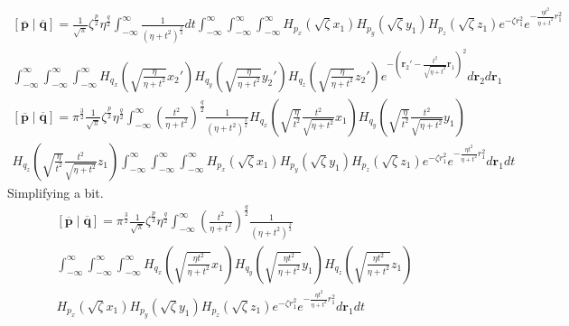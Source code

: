 \begin{multline}
  \left[\overline{\mathbf{p}}\middle|\overline{\mathbf{q}}\right] = \frac{1}{\sqrt{\pi}} \zeta^{\frac{p}{2}} \eta^{\frac{q}{2}} \int_{-\infty}^\infty \frac{1}{\left(\eta + t^2\right)^{\frac{3}{2}}} dt \int_{-\infty}^\infty \int_{-\infty}^\infty \int_{-\infty}^\infty H_{p_x}\left(\sqrt{\zeta} x_1\right) H_{p_y}\left(\sqrt{\zeta} y_1\right) H_{p_z}\left(\sqrt{\zeta} z_1\right) e^{-\zeta r_1^2}e^{-\frac{\eta t^2}{\eta + t^2}r_1^2} \\
  \int_{-\infty}^\infty \int_{-\infty}^\infty \int_{-\infty}^\infty H_{q_x}\left(\sqrt{\frac{\eta}{\eta + t^2}}x_2'\right)H_{q_y}\left(\sqrt{\frac{\eta}{\eta + t^2}}y_2'\right)H_{q_z}\left(\sqrt{\frac{\eta}{\eta + t^2}}z_2'\right) e^{-\left(\mathbf{r}_2' - \frac{t^2}{\sqrt{\eta + t^2}}\mathbf{r}_1\right)^2} d\mathbf{r}_2 d\mathbf{r}_1
\end{multline}
\begin{multline}
  \left[\overline{\mathbf{p}}\middle|\overline{\mathbf{q}}\right] = \pi^{\frac{3}{2}} \frac{1}{\sqrt{\pi}} \zeta^{\frac{p}{2}} \eta^{\frac{q}{2}} \int_{-\infty}^\infty \left(\frac{t^2}{\eta + t^2}\right)^{\frac{q}{2}} \frac{1}{\left(\eta + t^2\right)^{\frac{3}{2}}} H_{q_x}\left(\sqrt{\frac{\eta}{t^2}}\frac{t^2}{\sqrt{\eta + t^2}} x_1\right) H_{q_y}\left(\sqrt{\frac{\eta}{t^2}}\frac{t^2}{\sqrt{\eta + t^2}} y_1\right)\\
  H_{q_z}\left(\sqrt{\frac{\eta}{t^2}}\frac{t^2}{\sqrt{\eta + t^2}} z_1\right)\int_{-\infty}^\infty \int_{-\infty}^\infty \int_{-\infty}^\infty H_{p_x}\left(\sqrt{\zeta} x_1\right) H_{p_y}\left(\sqrt{\zeta} y_1\right) H_{p_z}\left(\sqrt{\zeta} z_1\right) e^{-\zeta r_1^2}e^{-\frac{\eta t^2}{\eta + t^2}r_1^2} d\mathbf{r}_1 dt  
\end{multline}
Simplifying a bit.
\begin{multline}
  \left[\overline{\mathbf{p}}\middle|\overline{\mathbf{q}}\right] = \pi^{\frac{3}{2}} \frac{1}{\sqrt{\pi}} \zeta^{\frac{p}{2}} \eta^{\frac{q}{2}} \int_{-\infty}^\infty \left(\frac{t^2}{\eta + t^2}\right)^{\frac{q}{2}}\frac{1}{\left(\eta + t^2\right)^{\frac{3}{2}}}\\
  \int_{-\infty}^\infty \int_{-\infty}^\infty \int_{-\infty}^\infty H_{q_x}\left(\sqrt{\frac{\eta t^2}{\eta + t^2}}x_1\right)H_{q_y}\left(\sqrt{\frac{\eta t^2}{\eta + t^2}} y_1\right)H_{q_z}\left(\sqrt{\frac{\eta t^2}{\eta + t^2}}z_1\right)\\
   H_{p_x}\left(\sqrt{\zeta} x_1\right) H_{p_y}\left(\sqrt{\zeta} y_1\right) H_{p_z}\left(\sqrt{\zeta} z_1\right) e^{-\zeta r_1^2}e^{-\frac{\eta t^2}{\eta + t^2}r_1^2} d\mathbf{r}_1 dt  
\end{multline}
